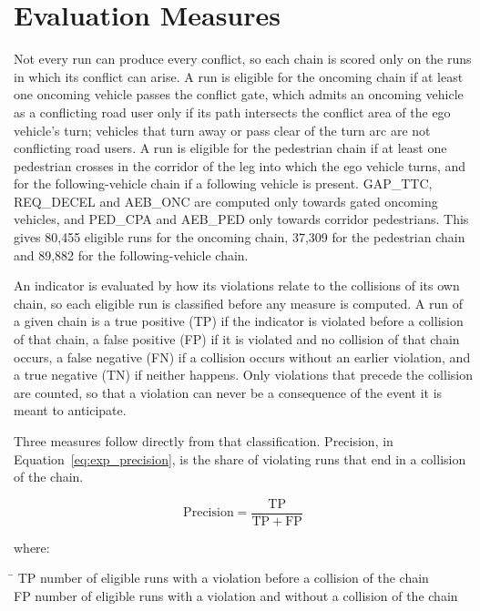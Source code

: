 \section{Evaluation Measures}
\label{sec:exp_criteria}

Not every run can produce every conflict, so each chain is scored only on the runs
in which its conflict can arise. A run is eligible for the oncoming chain if at least
one oncoming vehicle passes the conflict gate, which admits an oncoming vehicle as a
conflicting road user only if its path intersects the conflict area of the ego vehicle's
turn; vehicles that turn away or pass clear of the turn arc are not conflicting road users. A run is eligible for the pedestrian chain if at least one pedestrian
crosses in the corridor of the leg into which the ego vehicle turns, and for the
following-vehicle chain if a following vehicle is present. GAP\_TTC, REQ\_DECEL and
AEB\_ONC are computed only towards gated oncoming vehicles, and PED\_CPA and AEB\_PED
only towards corridor pedestrians. This gives 80,455 eligible runs for the oncoming
chain, 37,309 for the pedestrian chain and 89,882 for the following-vehicle chain.

An indicator is evaluated by how its violations relate to the collisions of its
own chain, so each eligible run is classified before any measure is computed. A
run of a given chain is a true positive (TP) if the indicator is violated before
a collision of that chain, a false positive (FP) if it is violated and no
collision of that chain occurs, a false negative (FN) if a collision occurs
without an earlier violation, and a true negative (TN) if neither happens. Only
violations that precede the collision are counted, so that a violation can never
be a consequence of the event it is meant to anticipate.

Three measures follow directly from that classification. Precision, in
Equation~\eqref{eq:exp_precision}, is the share of violating runs that end in a
collision of the chain.

\begin{equation}
    \mathrm{Precision} = \frac{\mathrm{TP}}{\mathrm{TP} + \mathrm{FP}}
    \label{eq:exp_precision}
\end{equation}

where:\nopagebreak
\begin{tabbing}
    \hspace{2.2cm} \= \kill
    TP \> number of eligible runs with a violation before a collision of the chain \\
    FP \> number of eligible runs with a violation and without a collision of the chain
\end{tabbing}

